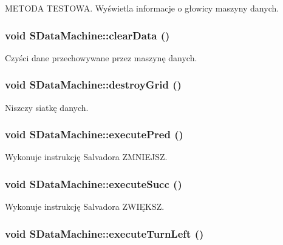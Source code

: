 METODA TESTOWA. Wyświetla informacje o głowicy maszyny danych. \hypertarget{classSDataMachine_b863ea9a42568d7555cc146ded9f2d88}{
\subsubsection[{clearData}]{\setlength{\rightskip}{0pt plus 5cm}void SDataMachine::clearData ()}}
\label{classSDataMachine_b863ea9a42568d7555cc146ded9f2d88}


Czyści dane przechowywane przez maszynę danych. \hypertarget{classSDataMachine_194dc73769d08eaccc158e2786b7059f}{
\subsubsection[{destroyGrid}]{\setlength{\rightskip}{0pt plus 5cm}void SDataMachine::destroyGrid ()}}
\label{classSDataMachine_194dc73769d08eaccc158e2786b7059f}


Niszczy siatkę danych. \hypertarget{classSDataMachine_87cfad868b3ea0a0e60f776ad3773678}{
\subsubsection[{executePred}]{\setlength{\rightskip}{0pt plus 5cm}void SDataMachine::executePred ()}}
\label{classSDataMachine_87cfad868b3ea0a0e60f776ad3773678}


Wykonuje instrukcję Salvadora ZMNIEJSZ. \hypertarget{classSDataMachine_85832e07e2fb8ae32160fe0c95a487d2}{
\subsubsection[{executeSucc}]{\setlength{\rightskip}{0pt plus 5cm}void SDataMachine::executeSucc ()}}
\label{classSDataMachine_85832e07e2fb8ae32160fe0c95a487d2}


Wykonuje instrukcję Salvadora ZWIĘKSZ. \hypertarget{classSDataMachine_5b46d50c18bec1bcfd5232bec3875fd5}{
\subsubsection[{executeTurnLeft}]{\setlength{\rightskip}{0pt plus 5cm}void SDataMachine::executeTurnLeft ()}}
\label{classSDataMachine_5b46d50c18bec1bcfd5232bec3875fd5}


